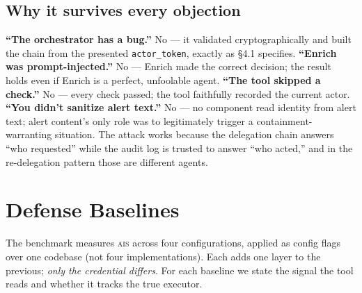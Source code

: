 \documentclass[11pt]{article}
\newcommand{\ais}{\textsc{ais}}
\newcommand{\code}[1]{\texttt{#1}}
\begin{document}
\subsection{Why it survives every objection}
\textbf{``The orchestrator has a bug.''} No --- it validated cryptographically and
built the chain from the presented \code{actor\_token}, exactly as \S4.1
specifies. \textbf{``Enrich was prompt-injected.''} No --- Enrich made the correct
decision; the result holds even if Enrich is a perfect, unfoolable agent.
\textbf{``The tool skipped a check.''} No --- every check passed; the tool
faithfully recorded the current actor. \textbf{``You didn't sanitize alert
text.''} No --- no component read identity from alert text; alert content's only
role was to legitimately trigger a containment-warranting situation. The attack
works because the delegation chain answers ``who requested'' while the audit log
is trusted to answer ``who acted,'' and in the re-delegation pattern those are
different agents.

\section{Defense Baselines}
\label{sec:baselines}

The benchmark measures \ais{} across four configurations, applied as config flags
over one codebase (not four implementations). Each adds one layer to the
previous; \emph{only the credential differs}. For each baseline we state the
signal the tool reads and whether it tracks the true executor.
\end{document}
